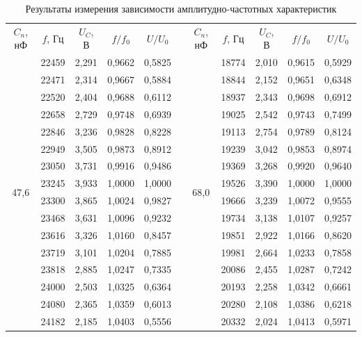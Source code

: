 \documentclass[a4paper, 12pt]{article}
\begin{document}
    \begin{table}[H]
        \centering
        \begin{tabular}{|c|c|c|c|c|c|c|c|c|c|c|}
        \cline{1-5} \cline{7-11}
        $C_n$, нФ & $f$, Гц & $U_C$, В & $f/f_0$ & $U/U_0$ & \multirow{17}{*}{} & $C_n$, нФ & $f$, Гц & $U_C$, В & $f/f_0$ & $U/U_0$ \\ \cline{1-5} \cline{7-11} 
        \multirow{16}{*}{47,6} & 22459 & 2,291 & 0,9662 & 0,5825 &  & \multirow{16}{*}{68,0} & 18774 & 2,010 & 0,9615 & 0,5929 \\ \cline{2-5} \cline{8-11} 
         & 22471 & 2,314 & 0,9667 & 0,5884 &  &  & 18844 & 2,152 & 0,9651 & 0,6348 \\ \cline{2-5} \cline{8-11} 
         & 22520 & 2,404 & 0,9688 & 0,6112 &  &  & 18937 & 2,343 & 0,9698 & 0,6912 \\ \cline{2-5} \cline{8-11} 
         & 22658 & 2,729 & 0,9748 & 0,6939 &  &  & 19025 & 2,542 & 0,9743 & 0,7499 \\ \cline{2-5} \cline{8-11} 
         & 22846 & 3,236 & 0,9828 & 0,8228 &  &  & 19113 & 2,754 & 0,9789 & 0,8124 \\ \cline{2-5} \cline{8-11} 
         & 22949 & 3,505 & 0,9873 & 0,8912 &  &  & 19239 & 3,042 & 0,9853 & 0,8974 \\ \cline{2-5} \cline{8-11} 
         & 23050 & 3,731 & 0,9916 & 0,9486 &  &  & 19369 & 3,268 & 0,9920 & 0,9640 \\ \cline{2-5} \cline{8-11} 
         & 23245 & 3,933 & 1,0000 & 1,0000 &  &  & 19526 & 3,390 & 1,0000 & 1,0000 \\ \cline{2-5} \cline{8-11} 
         & 23300 & 3,865 & 1,0024 & 0,9827 &  &  & 19666 & 3,239 & 1,0072 & 0,9555 \\ \cline{2-5} \cline{8-11} 
         & 23468 & 3,631 & 1,0096 & 0,9232 &  &  & 19734 & 3,138 & 1,0107 & 0,9257 \\ \cline{2-5} \cline{8-11} 
         & 23616 & 3,326 & 1,0160 & 0,8457 &  &  & 19851 & 2,922 & 1,0166 & 0,8620 \\ \cline{2-5} \cline{8-11} 
         & 23719 & 3,101 & 1,0204 & 0,7885 &  &  & 19981 & 2,664 & 1,0233 & 0,7858 \\ \cline{2-5} \cline{8-11} 
         & 23818 & 2,885 & 1,0247 & 0,7335 &  &  & 20086 & 2,455 & 1,0287 & 0,7242 \\ \cline{2-5} \cline{8-11} 
         & 24000 & 2,503 & 1,0325 & 0,6364 &  &  & 20193 & 2,258 & 1,0342 & 0,6661 \\ \cline{2-5} \cline{8-11} 
         & 24080 & 2,365 & 1,0359 & 0,6013 &  &  & 20280 & 2,108 & 1,0386 & 0,6218 \\ \cline{2-5} \cline{8-11} 
         & 24182 & 2,185 & 1,0403 & 0,5556 &  &  & 20332 & 2,024 & 1,0413 & 0,5971 \\ \cline{1-5} \cline{7-11}
        \end{tabular}
        \caption{Результаты измерения зависимости амплитудно-частотных характеристик}
        \label{tab:res_AFC}
    \end{table}
\end{document}

